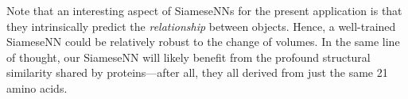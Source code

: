 Note that an interesting aspect of SiameseNNs for the present application is that they intrinsically predict the \textit{relationship} between objects.
Hence, a well-trained SiameseNN could be relatively robust to the change of volumes.
In the same line of thought, our SiameseNN will likely benefit from the profound structural similarity shared by proteins---after all, they all derived from just the same 21 amino acids.